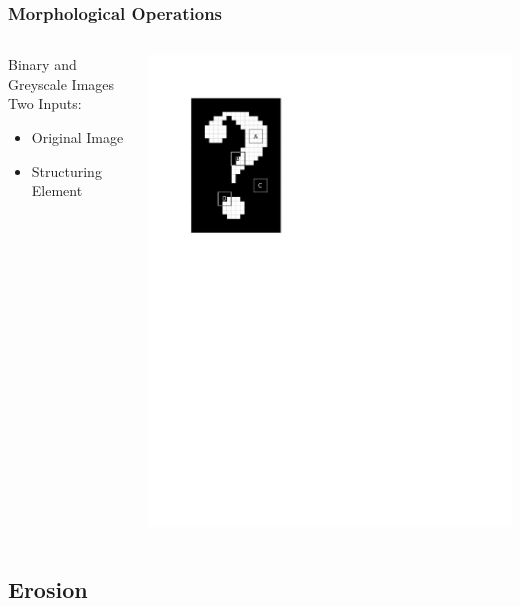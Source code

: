 \documentclass{beamer}
\begin{document}
\begin{frame}
\frametitle{Morphological Operations}
\begin{columns}
\begin{column}{0.5\textwidth}
Binary and Greyscale Images
\linebreak
\linebreak
Two Inputs:
\begin{itemize}
\item Original Image
\item Structuring Element
\end{itemize}
\end{column}
\begin{column}{0.5\textwidth}
\includegraphics[width=1\textwidth,trim={0 6.5in 4in 0},clip]{structuring_element_placement}
\end{column}
\end{columns}
\end{frame}

\subsection[Erosion]{Erosion}
\end{document}
